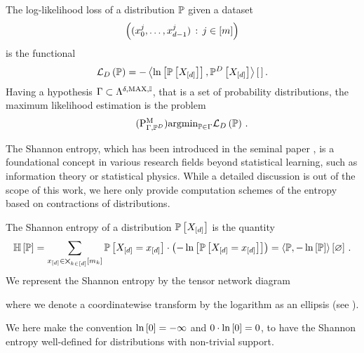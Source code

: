 \begin{definition}
    \label{def:loss}
    The log-likelihood loss of a distribution $\mathbb{P}$ given a dataset
    \begin{align*}
        \left(({x_{0}^{j},\ldots,x_{d-1}^{j}})\,:\,j\in[m]\right)
    \end{align*}
    is the functional
    \begin{align*}
        \mathcal{L}_{D}\left(\mathbb{P}\right)
        = -\left\langle \ln \left[ \mathbb{P}\left[X_{[d]}\right] \right],\mathbb{P}^{D}\left[X_{[d]}\right]\right\rangle \left[ \, \right] .
    \end{align*}
    Having a hypothesis $\Gamma\subset\Lambda^{\delta,\mathrm{MAX},\mathbb{I}}$, that is a set of probability distributions, the maximum likelihood estimation is the problem
    \begin{align}
        \label{prob:parameterMaxLikelihood}\tag{$\probtagtypeinst{\mprojectionsymbol}{\probtensorset,\empdistribution}$}
        \argmin_{\probtensorin} \lossof{\probtensor} \, .
    \end{align}
\end{definition}



The Shannon entropy, which has been introduced in the seminal paper \cite{shannon_mathematical_1948}, is a foundational concept in various research fields beyond statistical learning, such as information theory or statistical physics.
While a detailed discussion is out of the scope of this work, we here only provide computation schemes of the entropy based on contractions of distributions.

\begin{definition}
    The Shannon entropy of a distribution $\mathbb{P}\left[X_{[d]}\right]$ is the quantity
    \begin{align*}
        \mathbb{H}\left[\mathbb{P}\right]
        =  \sum_{x_{[d]}\in\bigtimes_{k\in[d]}[m_{k}]} \mathbb{P}\left[X_{[d]}=x_{[d]}\right] \cdot \left(-\ln \left[ \mathbb{P}\left[X_{[d]}=x_{[d]}\right] \right]\right)
        = \left\langle \mathbb{P},-\ln \left[ \mathbb{P} \right]\right\rangle \left[ \varnothing \right] \, .
    \end{align*}
    We represent the Shannon entropy by the tensor network diagram
    \begin{center}
        
    \end{center}
    where we denote a coordinatewise transform by the logarithm as an ellipsis (see ).
\end{definition}

We here make the convention $\ln \left[ 0 \right]=-\infty$ and $0\cdot\ln \left[ 0 \right] = 0$, to have the Shannon entropy well-defined for distributions with non-trivial support.


